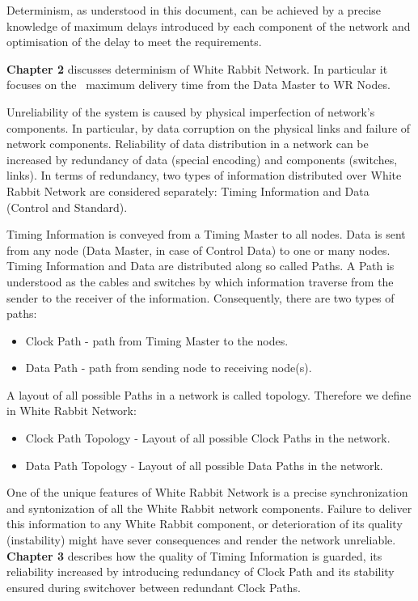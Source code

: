 Determinism, as understood in this document, can be achieved by a precise
knowledge of maximum delays introduced by each component of the network and 
optimisation of the delay to meet the requirements. 

\textbf{Chapter 2} discusses determinism of White Rabbit Network. In particular
it focuses on the \ControlMessage\ maximum delivery time from the Data Master
to WR Nodes. 

Unreliability of the system is caused by physical imperfection of network's
components. In particular, by data corruption on the physical links and failure
of network components. Reliability of data distribution in a network can be
increased by redundancy of data (special encoding) and components
(switches, links). In terms of redundancy, two types of information
distributed over White Rabbit Network are considered separately: Timing
Information and Data (Control and Standard). 

Timing Information is conveyed from a Timing Master to all nodes. Data is
sent from any node (Data Master, in case of Control Data) to one or many nodes.
Timing Information and Data are distributed along so called Paths. A Path is
understood as the cables and switches by which information traverse from the
sender to the receiver of the information. Consequently, there are two types of
paths:
\begin{itemize}
  \item Clock Path - path from Timing Master to the nodes.
  \item Data Path - path from sending node to receiving node(s).
\end{itemize}
A layout of all possible Paths in a network is called topology. Therefore we
define in White Rabbit Network:

\begin{itemize}
  \item Clock Path Topology - Layout of all possible Clock Paths in the
network.
  \item Data Path Topology - Layout of all possible Data Paths in the
network.
\end{itemize}

One of the unique features of White Rabbit Network is a precise synchronization
and syntonization of all the White Rabbit network components. Failure to deliver
this information to any White Rabbit component, or deterioration of its quality
(instability) might have sever consequences and render the network unreliable.
\textbf{Chapter 3} describes how the quality of Timing Information is
guarded, its reliability increased by introducing redundancy of Clock Path and
its stability ensured during switchover between redundant Clock Paths.

